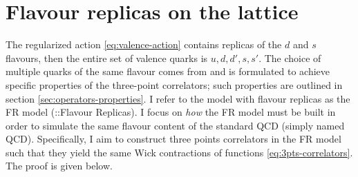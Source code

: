 \documentclass[english, LaM, oneside, noexaminfo]{sapthesis}
\begin{document}
\section{Flavour replicas on the lattice}
\noindent
The regularized action \ref{eq:valence-action} contains replicas of the $d$ and $s$ flavours, then the entire set of valence quarks is $u,d,d',s,s'$.
The choice of multiple quarks of the same flavour comes from \cite{FR2}  and is formulated to achieve specific properties of the three-point correlators;
such properties are outlined in section \ref{sec:operators-properties}.
I refer to the model with flavour replicas as the FR model (::Flavour Replicas).
\newline
I focus on \textit{how} the FR model must be built in order to simulate the same flavour content of the standard QCD (simply named QCD).
Specifically, I aim to construct three points correlators in the FR model such that they yield the same Wick contractions of functions \ref{eq:3pts-correlators}.
The proof is given below.
\end{document}
